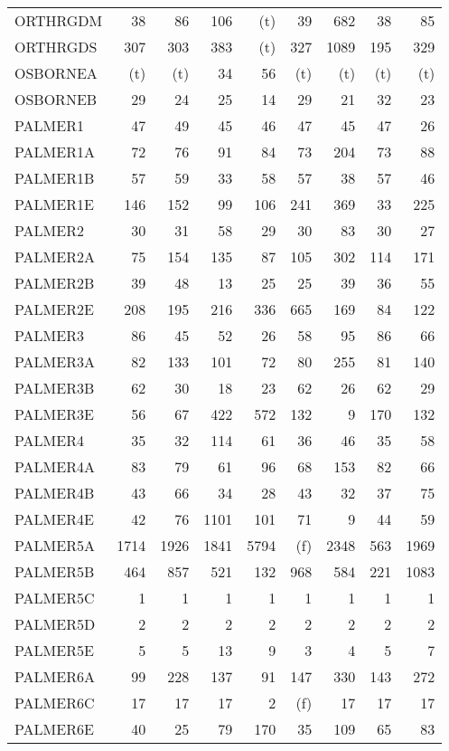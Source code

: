 \documentclass[11pt,twoside]{article}
\begin{document}
{\begin{longtable}[c]{|l|r|r|r|r|r|r|r|r|}
 ORTHRGDM & 38 & 86 & 106 & (t) & 39 & 682 & 38 & 85 \\
 ORTHRGDS & 307 & 303 & 383 & (t) & 327 & 1089 & 195 & 329 \\
 OSBORNEA & (t) & (t) & 34 & 56 & (t) & (t) & (t) & (t) \\
 OSBORNEB & 29 & 24 & 25 & 14 & 29 & 21 & 32 & 23 \\
 PALMER1 & 47 & 49 & 45 & 46 & 47 & 45 & 47 & 26 \\
 PALMER1A & 72 & 76 & 91 & 84 & 73 & 204 & 73 & 88 \\
 PALMER1B & 57 & 59 & 33 & 58 & 57 & 38 & 57 & 46 \\
 PALMER1E & 146 & 152 & 99 & 106 & 241 & 369 & 33 & 225 \\
 PALMER2 & 30 & 31 & 58 & 29 & 30 & 83 & 30 & 27 \\
 PALMER2A & 75 & 154 & 135 & 87 & 105 & 302 & 114 & 171 \\
 PALMER2B & 39 & 48 & 13 & 25 & 25 & 39 & 36 & 55 \\
 PALMER2E & 208 & 195 & 216 & 336 & 665 & 169 & 84 & 122 \\
 PALMER3 & 86 & 45 & 52 & 26 & 58 & 95 & 86 & 66 \\
 PALMER3A & 82 & 133 & 101 & 72 & 80 & 255 & 81 & 140 \\
 PALMER3B & 62 & 30 & 18 & 23 & 62 & 26 & 62 & 29 \\
 PALMER3E & 56 & 67 & 422 & 572 & 132 & 9 & 170 & 132 \\
 PALMER4 & 35 & 32 & 114 & 61 & 36 & 46 & 35 & 58 \\
 PALMER4A & 83 & 79 & 61 & 96 & 68 & 153 & 82 & 66 \\
 PALMER4B & 43 & 66 & 34 & 28 & 43 & 32 & 37 & 75 \\
 PALMER4E & 42 & 76 & 1101 & 101 & 71 & 9 & 44 & 59 \\
 PALMER5A & 1714 & 1926 & 1841 & 5794 & (f) & 2348 & 563 & 1969 \\
 PALMER5B & 464 & 857 & 521 & 132 & 968 & 584 & 221 & 1083 \\
 PALMER5C & 1 & 1 & 1 & 1 & 1 & 1 & 1 & 1 \\
 PALMER5D & 2 & 2 & 2 & 2 & 2 & 2 & 2 & 2 \\
 PALMER5E & 5 & 5 & 13 & 9 & 3 & 4 & 5 & 7 \\
 PALMER6A & 99 & 228 & 137 & 91 & 147 & 330 & 143 & 272 \\
 PALMER6C & 17 & 17 & 17 & 2 & (f) & 17 & 17 & 17 \\
 PALMER6E & 40 & 25 & 79 & 170 & 35 & 109 & 65 & 83 \\

\end{longtable}}
\end{document}
